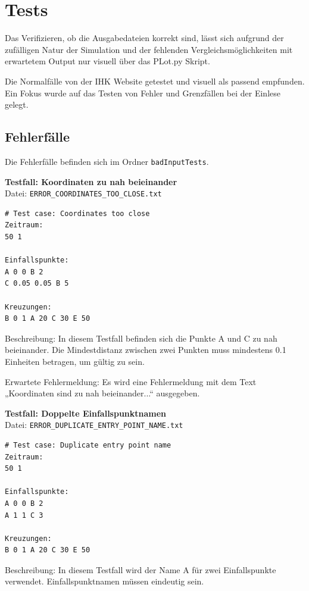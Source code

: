 \chapter{Tests}

Das Verifizieren, ob die Ausgabedateien korrekt sind,
lässt sich aufgrund der zufälligen Natur der Simulation und der fehlenden Vergleichsmöglichkeiten mit erwartetem Output
nur visuell über das PLot.py Skript.

Die Normalfälle von der IHK Website getestet und visuell als passend empfunden.
Ein Fokus wurde auf das Testen von Fehler und Grenzfällen bei der Einlese gelegt.

\section{Fehlerfälle}
Die Fehlerfälle befinden sich im Ordner \texttt{badInputTests}.

\textbf{Testfall: Koordinaten zu nah beieinander} \\
Datei: \texttt{ERROR\_COORDINATES\_TOO\_CLOSE.txt}

\begin{lstlisting}
# Test case: Coordinates too close
Zeitraum:
50 1

Einfallspunkte:
A 0 0 B 2
C 0.05 0.05 B 5

Kreuzungen:
B 0 1 A 20 C 30 E 50
\end{lstlisting}

Beschreibung: In diesem Testfall befinden sich die Punkte A und C zu nah beieinander.
Die Mindestdistanz zwischen zwei Punkten muss mindestens 0.1 Einheiten betragen, um gültig zu sein.

Erwartete Fehlermeldung: Es wird eine Fehlermeldung mit dem Text „Koordinaten sind zu nah beieinander...“ ausgegeben.
\clearpage

\textbf{Testfall: Doppelte Einfallspunktnamen} \\
Datei: \texttt{ERROR\_DUPLICATE\_ENTRY\_POINT\_NAME.txt}

\begin{lstlisting}
# Test case: Duplicate entry point name
Zeitraum:
50 1

Einfallspunkte:
A 0 0 B 2
A 1 1 C 3

Kreuzungen:
B 0 1 A 20 C 30 E 50
\end{lstlisting}

Beschreibung: In diesem Testfall wird der Name A für zwei Einfallspunkte verwendet.
Einfallspunktnamen müssen eindeutig sein.

